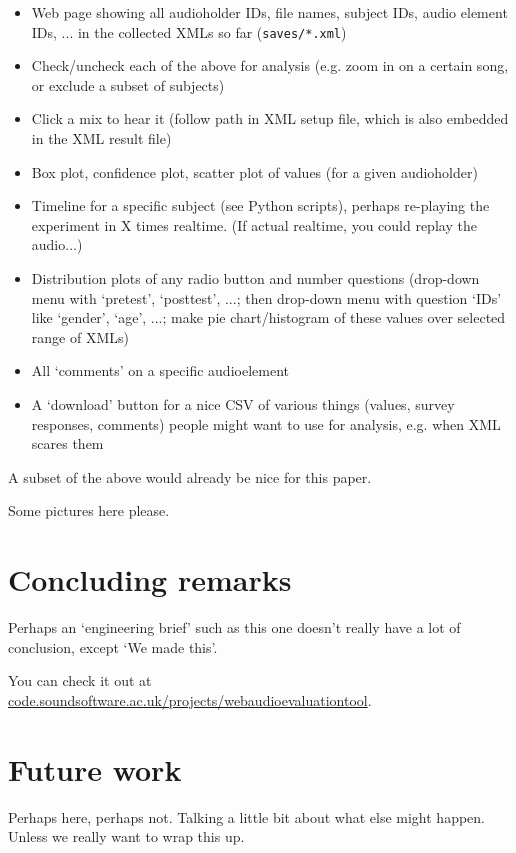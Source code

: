 \documentclass{sig-alternate}
\begin{document}
	\begin{itemize}
		\item Web page showing all audioholder IDs, file names, subject IDs, audio element IDs, ... in the collected XMLs so far (\texttt{saves/*.xml})
		\item Check/uncheck each of the above for analysis (e.g. zoom in on a certain song, or exclude a subset of subjects)
		\item Click a mix to hear it (follow path in XML setup file, which is also embedded in the XML result file)
		\item Box plot, confidence plot, scatter plot of values (for a given audioholder)
		\item Timeline for a specific subject (see Python scripts), perhaps re-playing the experiment in X times realtime. (If actual realtime, you could replay the audio...)
		\item Distribution plots of any radio button and number questions (drop-down menu with `pretest', `posttest', ...; then drop-down menu with question `IDs' like `gender', `age', ...; make pie chart/histogram of these values over selected range of XMLs)
		\item All `comments' on a specific audioelement
		\item A `download' button for a nice CSV of various things (values, survey responses, comments) people might want to use for analysis, e.g. when XML scares them
	\end{itemize}

	A subset of the above would already be nice for this paper. 
	
	Some pictures here please. 

\section{Concluding remarks}
	Perhaps an `engineering brief' such as this one doesn't really have a lot of conclusion, except `We made this'. 
	
	You can check it out at \url{code.soundsoftware.ac.uk/projects/webaudioevaluationtool}. 
	
\section{Future work}
	Perhaps here, perhaps not. Talking a little bit about what else might happen. Unless we really want to wrap this up. 

%

%
%
\end{document}
